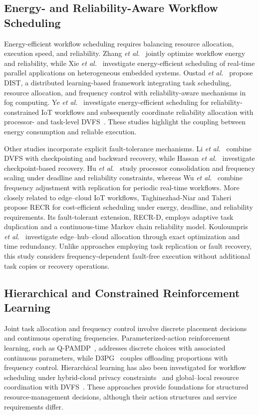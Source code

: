 \documentclass[journal]{IEEEtran}
\begin{document}
\subsection{Energy- and Reliability-Aware Workflow Scheduling}
Energy-efficient workflow scheduling requires balancing resource allocation, execution speed, and reliability. Zhang \emph{et al.}~\cite{zhang2017} jointly optimize workflow energy and reliability, while Xie \emph{et al.}~\cite{xie2017energy} investigate energy-efficient scheduling of real-time parallel applications on heterogeneous embedded systems. Oustad \emph{et al.}~\cite{oustad2025dist} propose DIST, a distributed learning-based framework integrating task scheduling, resource allocation, and frequency control with reliability-aware mechanisms in fog computing. Ye \emph{et al.}~\cite{ye2025multistages} investigate energy-efficient scheduling for reliability-constrained IoT workflows and subsequently coordinate reliability allocation with processor- and task-level DVFS~\cite{ye2026}. These studies highlight the coupling between energy consumption and reliable execution.

Other studies incorporate explicit fault-tolerance mechanisms. Li \emph{et al.}~\cite{li2015checkpoint} combine DVFS with checkpointing and backward recovery, while Hassan \emph{et al.}~\cite{hassan2020} investigate checkpoint-based recovery. Hu \emph{et al.}~\cite{hu2022} study processor consolidation and frequency scaling under deadline and reliability constraints, whereas Wu \emph{et al.}~\cite{wu2023} combine frequency adjustment with replication for periodic real-time workflows. More closely related to edge--cloud IoT workflows, Taghinezhad-Niar and Taheri~\cite{taghinezhad2025} propose RECR for cost-efficient scheduling under energy, deadline, and reliability requirements. Its fault-tolerant extension, RECR-D, employs adaptive task duplication and a continuous-time Markov chain reliability model. Kouloumpris \emph{et al.}~\cite{kouloumpris2026} investigate edge--hub--cloud allocation through exact optimization and time redundancy. Unlike approaches employing task replication or fault recovery, this study considers frequency-dependent fault-free execution without additional task copies or recovery operations.

\subsection{Hierarchical and Constrained Reinforcement Learning}
Joint task allocation and frequency control involve discrete placement decisions and continuous operating frequencies. Parameterized-action reinforcement learning, such as Q-PAMDP~\cite{masson2016parameterized}, addresses discrete choices with associated continuous parameters, while D3PG~\cite{ale2022d3pg} couples offloading proportions with frequency control. Hierarchical learning has also been investigated for workflow scheduling under hybrid-cloud privacy constraints~\cite{gu2026} and global--local resource coordination with DVFS~\cite{praveen2026crvrf}. These approaches provide foundations for structured resource-management decisions, although their action structures and service requirements differ.
\end{document}
